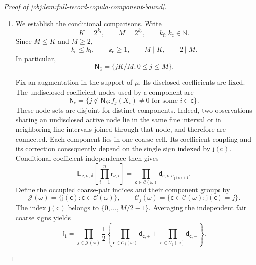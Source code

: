 \begin{proof}[Proof of \cref{obj:lem:full-record-copula-component-bound}]
\begin{enumerate}
Let the disclosure law be the pushforward of independent fair coefficient pairs:
\[
\mu_{\partial}
 =
 4^{-(K+1)}
 \sum_{\boldsymbol\lambda,\boldsymbol\eta\in\{-1,1\}^{K+1}}
 \operatorname{Dirac}_{\mathsf D(\boldsymbol\lambda,\boldsymbol\eta)},
\qquad
\mu
 =\lambda^{\otimes n}
   \otimes\operatorname{Bernoulli}(\varepsilon)^{\otimes n}
   \otimes\mu_{\partial}.
\]
It is a probability law with the required covariate and flag marginals, and
\[
\delta_j\ne\bot\ \Longleftrightarrow\ j\in\mathsf N_{\partial}
\qquad\text{for }\mu\text{-almost every }\omega.
\]
The kernels are measurable: the graph is determined by finitely many measurable cell assignments, and all coefficient and label averages are finite. Their normalization gives
\[
(\mu\otimes P_\nu)\circ\operatorname{pr}_{\mathrm{aug}}^{-1}
 =\mu,\qquad \nu\in\{0,1\},
\qquad
(\mu\otimes Q)(\mathsf\Omega_{\mathrm{aug}}\times\mathsf Z_n)=1.
\]

\item\label{proof:full-record-copula-component-bound:conditional-comparisons}
We establish the conditional comparisons. Write
\[
K=2^{k_{\mathrm f}},\qquad M=2^{k_{\mathrm c}},
\qquad k_{\mathrm f},k_{\mathrm c}\in\mathbb N.
\]
Since \(M\le K\) and \(M\ge2\),
\[
k_{\mathrm c}\le k_{\mathrm f},
\qquad k_{\mathrm c}\ge1,
\qquad M\mid K,\qquad 2\mid M.
\]
In particular,
\[
\mathsf N_{\partial}
 =\{jK/M:0\le j\le M\}.
\]

Fix an augmentation in the support of \(\mu\). Its disclosed coefficients are fixed. The undisclosed coefficient nodes used by a component are
\[
\mathsf N_{\mathsf c}
 =
 \{j\notin\mathsf N_{\partial}:
       f_j(X_i)\ne0\text{ for some }i\in\mathsf c\}.
\]
These node sets are disjoint for distinct components. Indeed, two observations sharing an undisclosed active node lie in the same fine interval or in neighboring fine intervals joined through that node, and therefore are connected. Each component lies in one coarse cell. Its coefficient coupling and its correction consequently depend on the single sign indexed by \(\mathsf j(\mathsf c)\). Conditional coefficient independence then gives
\[
\mathbb E_{\nu,\sigma,\delta}
 \left[\prod_{i=1}^n\mathsf r_{\nu,i}\right]
 =
 \prod_{\mathsf c\in\mathscr C(\omega)}
 \mathsf d_{\mathsf c,\nu,\sigma_{\mathsf j(\mathsf c)+1}}.
\]
Define the occupied coarse-pair indices and their component groups by
\[
\mathscr J(\omega)
 =\{\mathsf j(\mathsf c):\mathsf c\in\mathscr C(\omega)\},
\qquad
\mathscr C_j(\omega)
 =\{\mathsf c\in\mathscr C(\omega):\mathsf j(\mathsf c)=j\}.
\]
The index \(\mathsf j(\mathsf c)\) belongs to \(\{0,\ldots,M/2-1\}\). Averaging the independent fair coarse signs yields
\[
\mathsf f_1
 =
 \prod_{j\in\mathscr J(\omega)}
 \frac12\left\{
   \prod_{\mathsf c\in\mathscr C_j(\omega)}
      \mathsf d_{\mathsf c,+}
   +
   \prod_{\mathsf c\in\mathscr C_j(\omega)}
      \mathsf d_{\mathsf c,-}
 \right\}.
\]


\end{enumerate}
\end{proof}
